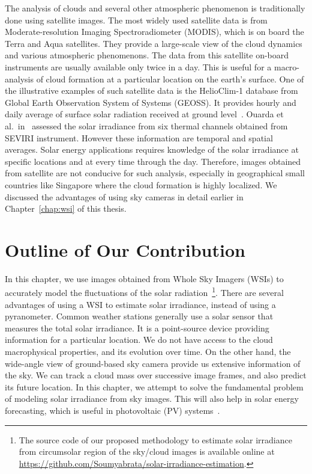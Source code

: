 The analysis of clouds and several other atmospheric phenomenon is traditionally done using satellite images. The most widely used satellite data is from Moderate-resolution Imaging Spectroradiometer (MODIS), which is on board the Terra and Aqua satellites. They provide a large-scale view of the cloud dynamics and various atmospheric phenomenons. The data from this satellite on-board instruments are usually available only twice in a day. This is useful for a macro-analysis of cloud formation at a particular location on the earth's surface. One of the illustrative examples of such satellite data is the HelioClim-1 database from Global
Earth Observation System of Systems (GEOSS). It provides hourly and daily average of surface solar radiation received at ground level~\cite{HelioClim2014}. Ouarda et al.\ in~\cite{SEVIRI2016} assessed the solar irradiance from six thermal channels obtained from SEVIRI instrument. However these information are temporal and spatial averages. Solar energy applications requires knowledge of the solar irradiance at specific locations and at every time through the day. Therefore, images obtained from satellite are not conducive for such analysis, especially in geographical small countries like Singapore where the cloud formation is highly localized. We discussed the advantages of using sky cameras in detail earlier in Chapter~\ref{chap:wsi} of this thesis. 

\section{Outline of Our Contribution}
In this chapter, we use images obtained from Whole Sky Imagers (WSIs) to accurately model the fluctuations of the solar radiation~\footnote{The source code of our proposed methodology to estimate solar irradiance from circumsolar region of the sky/cloud images is available online at \url{https://github.com/Soumyabrata/solar-irradiance-estimation}.}. There are several advantages of using a WSI to estimate solar irradiance, instead of using a pyranometer. Common weather stations generally use a solar sensor that measures the total solar irradiance. It is a point-source device providing information for a particular location. We do not have access to the cloud macrophysical properties, and its evolution over time. On the other hand, the wide-angle view of ground-based sky camera provide us extensive information of the sky. We can track a cloud mass over successive image frames, and also predict its future location. In this chapter, we attempt to solve the fundamental problem of modeling solar irradiance from sky images. This will also help in solar energy forecasting, which is useful in photovoltaic (PV) systems~\cite{solar_PV}.

